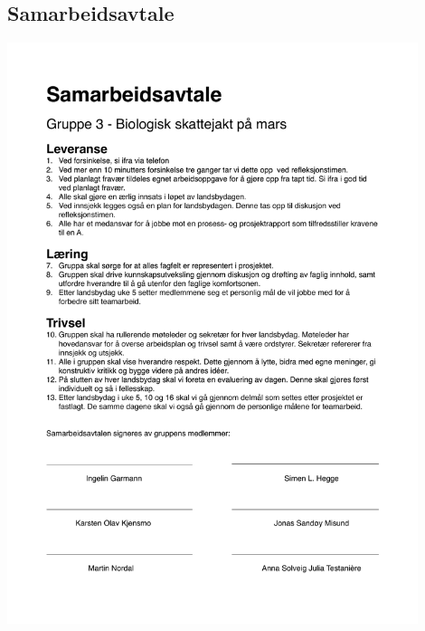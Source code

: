\begin{appendices}
\section{Samarbeidsavtale}
\label{Ved:samarbeidsavtale}
\begin{center}	
	\includegraphics[width=0.9\textwidth]{Samarbeidsavtale.pdf}
\end{center}


\end{appendices}
